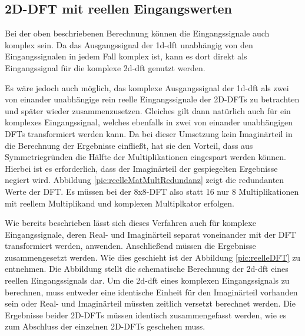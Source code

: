 \subsection{2D-DFT mit reellen Eingangswerten}\label{sec:rein_reelle_dft}
Bei der oben beschriebenen Berechnung können die Eingangssignale auch komplex sein. Da das Ausgangssignal der \gls{1d-dft} unabhängig von den Eingangssignalen in jedem Fall 
komplex ist, kann es dort direkt als Eingangssignal für die komplexe \gls{2d-dft} genutzt werden. 

Es wäre jedoch auch möglich, das komplexe Ausgangssignal der \gls{1d-dft} als zwei von einander unabhängige rein reelle Eingangssignale der 2D-DFTs zu betrachten und später 
wieder zusammenzusetzen. Gleiches gilt dann natürlich auch für ein komplexes Eingangssignal, welches ebenfalls in zwei von einander unabhängigen DFTs transformiert werden kann.
Da bei dieser Umsetzung kein Imaginärteil in die Berechnung der Ergebnisse einfließt, hat sie den Vorteil, dass aus Symmetriegründen die Hälfte der Multiplikationen 
eingespart werden können. Hierbei ist es erforderlich, dass der Imaginärteil der gespiegelten Ergebnisse negiert wird. Abbildung \ref{pic:reelleMatMultRedundanz} zeigt die 
redundanten Werte der DFT. Es müssen bei der 8x8-DFT also statt 16 nur 8 Multiplikationen mit reellem Multiplikand und komplexen Multiplkator erfolgen.

Wie bereits beschrieben lässt sich dieses Verfahren auch für komplexe Eingangssignale, deren Real- und Imaginärteil separat voneinander mit der DFT transformiert werden, anwenden.
Anschließend müssen die Ergebnisse zusammengesetzt werden. Wie dies geschieht ist der Abbildung \ref{pic:reelleDFT} zu entnehmen.
Die Abbildung stellt die schematische Berechnung der \gls{2d-dft} eines reellen Eingangssignals dar. 
Um die \gls{2d-dft} eines komplexen Eingangssignals zu berechnen, muss entweder eine identische Einheit für den Imaginärteil vorhanden sein oder Real- und Imaginärteil müssten
zeitlich versetzt berechnet werden. Die Ergebnisse beider 2D-DFTs müssen identisch zusammengefasst werden, wie es zum Abschluss der einzelnen 2D-DFTs geschehen muss.

